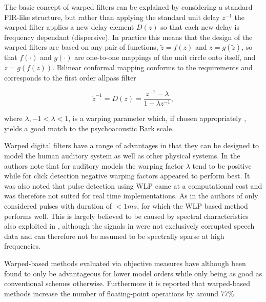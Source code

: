 The basic concept of warped filters can be explained by considering a standard FIR-like structure, but rather than applying the standard unit delay $z^{-1}$ the warped filter applies a new delay element $D(z)$ so that each new delay is frequency dependant (dispersive). In practice this means that the design of the warped filters are based on any pair of functions, $\tilde{z} = f(z)$ and $z = g(\tilde{z})$, so that $f(\cdot)$ and $g(\cdot)$ are one-to-one mappings of the unit circle onto itself, and $z = g\left( f(z) \right)$\cite{Karjalainen1997}. Bilinear conformal mapping\cite{Brown1996} conforms to the requirements and corresponds to the first order allpass filter

\begin{equation}\label{eq:Karjalainen1997}
\tilde{z}^{-1} = D(z) = \frac{z^{-1} - \lambda}{1 - \lambda z^{-1}},
\end{equation}

where $\lambda, -1 < \lambda < 1$, is a warping parameter which, if chosen appropriately \cite{Karjalainen1997}, yields a good match to the psychoacoustic Bark scale\cite{Smith1995}.

Warped digital filters have a range of advantages in that they can be designed to model the human auditory system as well as other physical systems\cite{Karjalainen1997}. In \cite{Esquef2002} the authors note that for auditory models the warping factor $\lambda$ tend to be positive while for click detection negative warping factors appeared to perform best. It was also noted that pulse detection using WLP came at a computational cost and was therefore not suited for real time implementations. As in \cite{Godsill1998book} the authors of \cite{Esquef2002} only considered pulses with duration of $<1 ms$, for which the WLP based method performs well. This is largely believed to be caused by spectral characteristics also exploited in \cite{Kasparis1993}\cite{US6795559}, although the signals in \cite{Esquef2002} were not exclusively corrupted speech data and can therefore not be assumed to be spectrally sparse at high frequencies.



Warped-based methods evaluated via objective measures have although been found to only be advantageous for lower model orders while only being as good as conventional schemes otherwise\cite{Esquef2003}\cite{Esquef2003a}. Furthermore it is reported that warped-based methods increase the number of floating-point operations by around 77\%\cite{Esquef2003}.
